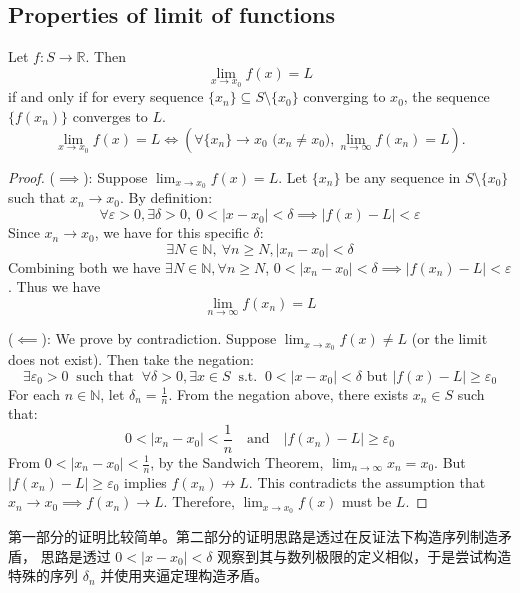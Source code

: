 \documentclass[
	UTF-8,
	11pt, %
	a4paper, %
]{LegrandOrangeBook}
\begin{document}
    \newpage

    \subsection{Properties of limit of functions}

    \begin{theorem}
    Let $f: S \to \mathbb{R}$. Then
    \[ \lim_{x \to x_0} f(x) = L \]
    if and only if for every sequence $\{x_n\} \subseteq S \setminus \{x_0\}$ converging to $x_0$, the sequence $\{f(x_n)\}$ converges to $L$.
    \[ \lim_{x \to x_0} f(x) = L \iff \left( \forall \{x_n\} \to x_0 \text{ ($x_n \neq x_0$)}, \lim_{n \to \infty} f(x_n) = L \right). \]
    \end{theorem}

    \begin{proof}
    ($\implies$):
    Suppose $\displaystyle\lim_{x \to x_0} f(x) = L$. Let $\{x_n\}$ 
    be any sequence in $S \setminus \{x_0\}$ such that $x_n \to x_0$. By definition:
    $$
        \forall \varepsilon > 0, \exists \delta > 0 ,\ 0 < |x - x_0| < \delta \implies |f(x) - L| < \varepsilon
    $$
    Since $x_n \to x_0$, we have for this specific $\delta$:
    $$
        \exists N \in \mathbb{N} ,\ \forall n \ge N, |x_n - x_0| < \delta
    $$
    Combining both we have $\exists N \in \mathbb{N}, \forall n \ge N$, $0 < |x_n - x_0| < \delta \implies |f(x_n) - L| < \varepsilon$. 
    Thus we have $$\lim_{n \to \infty} f(x_n) = L$$

    ($\impliedby$):
    We prove by contradiction.
    Suppose $\lim_{x \to x_0} f(x) \neq L$ (or the limit does not exist).
    Then take the negation:
    \[ \exists \varepsilon_0 > 0\ \text{ such that }\ \forall \delta > 0, 
    \exists x \in S\ \text{ s.t. }\ 0 < |x - x_0| < \delta \text{ but } |f(x) - L| \ge \varepsilon_0 \]
    For each $n \in \mathbb{N}$, let $\delta_n = \frac{1}{n}$. From the negation above, there exists $x_n \in S$ such that:
    \[ 0 < |x_n - x_0| < \frac{1}{n} \quad \text{and} \quad |f(x_n) - L| \ge \varepsilon_0 \]
    From $0 < |x_n - x_0| < \frac{1}{n}$, 
    by the Sandwich Theorem, $\displaystyle\lim_{n \to \infty} x_n = x_0$. 
    But $|f(x_n) - L| \ge \varepsilon_0$ implies ${f(x_n)  \nrightarrow L}$. 
    This contradicts the assumption that $x_n \to x_0 \implies f(x_n) \to L$. Therefore, $\displaystyle\lim_{x \to x_0} f(x)$ must be $L$.
    \end{proof}

    \begin{remark}
        第一部分的证明比较简单。第二部分的证明思路是透过在反证法下构造序列制造矛盾，
        思路是透过 $0 < |x - x_0| < \delta$ 观察到其与数列极限的定义相似，于是尝试构造特殊的序列 $\delta_n$ 
        并使用夹逼定理构造矛盾。
    \end{remark}
\end{document}

